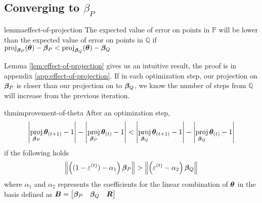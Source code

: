 \documentclass{article} %
\DeclareMathOperator{\proj}{proj}
\newcommand{\norm}[1]{\left\lVert#1\right\rVert}
\begin{document}
	\subsection{Converging to $\beta_P$}

	\begin{restatable}{lemma}{effect-of-projection}
		\label{lem:effect-of-projection}
		The expected value of error on points in $\mathbb{P}$ will be lower than the expected value of error on points in $\mathbb{Q}$ if $\proj_{\vbeta_P}(\vtheta) - \vbeta_P < \proj_{\vbeta_Q}(\vtheta) - \vbeta_Q$
	\end{restatable}
	
	Lemma \ref{lem:effect-of-projection} gives us an intuitive result, the proof is in appendix \ref{app:effect-of-projection}. If in each optimization step, our projection on ${\bm{\beta}}_P$ is closer than our projection on to ${\bm{\beta}}_Q$, we know the number of steps from $\mathbb{Q}$ will increase from the previous iteration.
	\begin{restatable}{thm}{improvement-of-theta}
		\label{thm:improvement-of-theta}
		After an optimization step, 
		\begin{equation*}
			\left|\proj_{\vbeta_P}\vtheta_{(t+1)} -1 \right| - \left|\proj_{\vbeta_P}\vtheta_{(t)} -1 \right| <  \left|\proj_{\vbeta_Q}\vtheta_{(t+1)} - 1\right| - \left|\proj_{\vbeta_Q}\vtheta_{(t)} - 1\right|
		\end{equation*}
			  if the following holds
		\begin{equation}
			\norm{\left((1-\varepsilon^{(t)}) - \alpha_1\right)\vbeta_P} > \norm{\left(\varepsilon^{(t)} - \alpha_2\right)\vbeta_Q}
		\end{equation}
		where $\alpha_1$ and $\alpha_2$ represents the coefficients for the linear combination of ${\bm{\theta}}$ in the basis defined as ${\bm{B}} = \begin{bmatrix} {\bm{\beta}}_P & {\bm{\beta}}_Q & {\bm{R}}\end{bmatrix}$
	\end{restatable}
\end{document}
